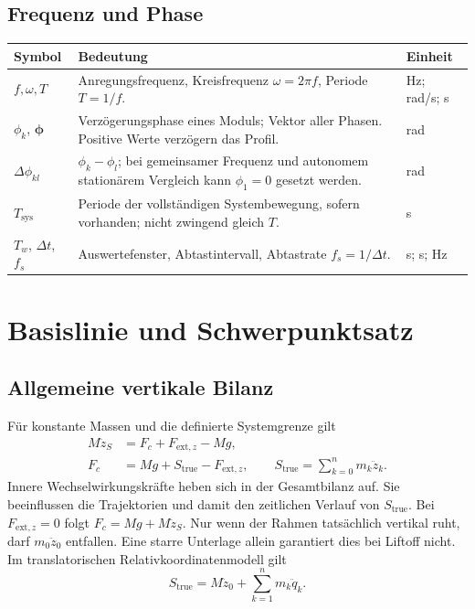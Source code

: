 \documentclass[11pt,a4paper]{article}
\makeatletter
\newenvironment{symtab}{\begin{longtable}{@{}L{.22\textwidth}L{.62\textwidth}L{.12\textwidth}@{}}\toprule\textbf{Symbol}&\textbf{Bedeutung}&\textbf{Einheit}\\\midrule\endhead}{\bottomrule\end{longtable}}
\makeatother
\begin{document}
\subsection{Frequenz und Phase}
\begin{symtab}
$f,\omega,T$&Anregungsfrequenz, Kreisfrequenz $\omega=2\pi f$, Periode $T=1/f$.&Hz; rad/s; s\\
$\phi_k$, $\boldsymbol\phi$&Verzögerungsphase eines Moduls; Vektor aller Phasen. Positive Werte verzögern das Profil.&rad\\
$\Delta\phi_{kl}$&$\phi_k-\phi_l$; bei gemeinsamer Frequenz und autonomem stationärem Vergleich kann $\phi_1=0$ gesetzt werden.&rad\\
$T_{\mathrm{sys}}$&Periode der vollständigen Systembewegung, sofern vorhanden; nicht zwingend gleich $T$.&s\\
$T_w$, $\Delta t$, $f_s$&Auswertefenster, Abtastintervall, Abtastrate $f_s=1/\Delta t$.&s; s; Hz\\
\end{symtab}

\section{Basislinie und Schwerpunktsatz}\label{sec:bilanz}
\subsection{Allgemeine vertikale Bilanz}
Für konstante Massen und die definierte Systemgrenze gilt
\begin{align}
M\ddot z_S&=F_c+F_{\mathrm{ext},z}-Mg,\\
F_c&=Mg+S_{\mathrm{true}}-F_{\mathrm{ext},z},\qquad
S_{\mathrm{true}}=\sum_{k=0}^{n}m_k\ddot z_k.
\label{eq:bilanz}
\end{align}
Innere Wechselwirkungskräfte heben sich in der Gesamtbilanz auf. Sie beeinflussen die Trajektorien und damit den zeitlichen Verlauf von $S_{\mathrm{true}}$.
Bei $F_{\mathrm{ext},z}=0$ folgt $F_c=Mg+M\ddot z_S$. Nur wenn der Rahmen tatsächlich vertikal ruht, darf $m_0\ddot z_0$ entfallen. Eine starre Unterlage allein garantiert dies bei Liftoff nicht. Im translatorischen Relativkoordinatenmodell gilt
\begin{equation}
S_{\mathrm{true}}=M\ddot z_0+\sum_{k=1}^{n}m_k\ddot q_k.
\label{eq:rahmen}
\end{equation}
\end{document}
